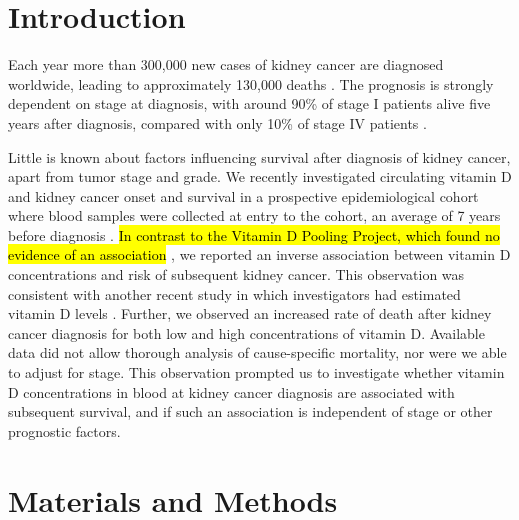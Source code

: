 \documentclass[a4paper,11pt]{article}
\begin{document}
\section*{Introduction}
Each year more than 300,000 new cases of kidney cancer are diagnosed worldwide, 
leading to approximately 130,000 deaths \cite{ferlay_cancer_2013}. The prognosis 
is strongly dependent on stage at diagnosis, with around 90\% of stage I 
patients alive five years after diagnosis, compared with only 10\% of stage IV 
patients \cite{CRUK_kidney_2014}.

Little is known about factors influencing survival after diagnosis of kidney 
cancer, apart from tumor stage and grade. We recently investigated circulating 
vitamin D and kidney cancer onset and survival in a prospective epidemiological 
cohort where blood samples were collected at entry to the cohort, an average 
of 7 years before diagnosis \cite{muller_circulating_2014}. \hl{In contrast to the 
Vitamin D Pooling Project, which found no evidence of an association} 
\cite{gallicchio_circulating_2010-1}, we reported an inverse association between 
vitamin D concentrations and risk of subsequent kidney cancer. This observation was
consistent with another recent study in which investigators had estimated vitamin D 
levels \cite{joh_predicted_2013}. Further, we observed an increased rate of death 
after kidney cancer diagnosis for both low and high concentrations of vitamin D. 
Available data did not allow thorough analysis of cause-specific mortality, nor were 
we able to adjust for stage. This observation prompted us to investigate whether 
vitamin D concentrations in blood at kidney cancer diagnosis are associated with 
subsequent survival, and if such an association is independent of stage or 
other prognostic factors.   

\section*{Materials and Methods}
\end{document}
